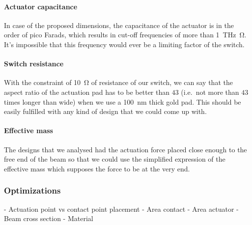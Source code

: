 \paragraph{Actuator capacitance}
In case of the proposed dimensions, the capacitance of the actuator is in the order of pico Farads, which results in cut-off frequencies of more than \SI{1}{\tera\hertz\ohm}.
It's impossible that this frequency would ever be a limiting factor of the switch.

\paragraph{Switch resistance}
With the constraint of \SI{10}{\ohm} of resistance of our switch, we can say that the aspect ratio of the actuation pad has to be better than $43$ (i.e.\ not more than $43$ times longer than wide) when we use a \SI{100}{\nano\meter} thick gold pad.
This should be easily fulfilled with any kind of design that we could come up with.

\paragraph{Effective mass}
The designs that we analysed had the actuation force placed close enough to the free end of the beam so that we could use the simplified expression of the effective mass which supposes the force to be at the very end.


\subsubsection{Optimizations}
\label{ssub:optimizations}




- Actuation point vs contact point placement
- Area contact
- Area actuator
- Beam cross section
- Material
